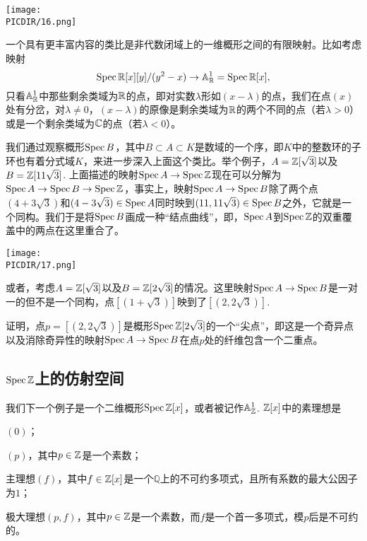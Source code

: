 \begin{center}\texttt{[image: \\PICDIR/16.png]}\end{center}

一个具有更丰富内容的类比是非代数闭域上的一维概形之间的有限映射。比如考虑映射
\[
	\operatorname{Spec} \mathbb{R}[x][y]/(y^2-x)\to \mathbb{A}_{\mathbb{R}}^1=\operatorname{Spec} \mathbb{R}[x],
\]
只看$\mathbb{A}_{\mathbb{R}}^1$中那些剩余类域为$\mathbb{R}$的点，即对实数$\lambda$形如$(x-\lambda)$的点，我们在点$(x)$处有分岔，对$\lambda\neq 0$，$(x-\lambda)$的原像是剩余类域为$\mathbb{R}$的两个不同的点（若$\lambda>0$）或是一个剩余类域为$\mathbb{C}$的点（若$\lambda<0$）。

我们通过观察概形$\operatorname{Spec} B$，其中$B\subset A\subset K$是数域的一个序，即$K$中的整数环的子环也有着分式域$K$，来进一步深入上面这个类比。举个例子，$A=\mathbb{Z}[\sqrt 3]$以及$B=\mathbb{Z}[11\sqrt 3]$. 上面描述的映射$\operatorname{Spec} A\to \operatorname{Spec} \mathbb{Z}$现在可以分解为$\operatorname{Spec} A\to \operatorname{Spec} B\to \operatorname{Spec} \mathbb{Z}$，事实上，映射$\operatorname{Spec} A\to \operatorname{Spec} B$除了两个点$(4+3\sqrt 3)$和$(4-3\sqrt 3)\in \operatorname{Spec} A$同时映到$(11,11\sqrt 3)\in\operatorname{Spec} B$之外，它就是一个同构。我们于是将$\operatorname{Spec} B$画成一种“结点曲线”，即，$\operatorname{Spec} A$到$\operatorname{Spec} \mathbb{Z}$的双重覆盖中的两点在这里重合了。

\begin{center}\texttt{[image: \\PICDIR/17.png]}\end{center}

或者，考虑$A=\mathbb{Z}[\sqrt 3]$以及$B=\mathbb{Z}[2\sqrt 3]$的情况。这里映射$\operatorname{Spec} A\to\operatorname{Spec} B$是一对一的但不是一个同构，点$[(1+\sqrt 3)]$映到了$[(2,2\sqrt{3})]$.

\begin{exe}
	证明，点$p=[(2,2\sqrt{3})]$是概形$\operatorname{Spec} \mathbb{Z}[2\sqrt 3]$的一个“尖点”，即这是一个奇异点以及消除奇异性的映射$\operatorname{Spec} A\to \operatorname{Spec} B$在点$p$处的纤维包含一个二重点。
\end{exe}

\subsection{\texorpdfstring{$\operatorname{Spec} \mathbb{Z}$}{Spec Z}上的仿射空间}

我们下一个例子是一个二维概形$\operatorname{Spec} \mathbb{Z}[x]$，或者被记作$\mathbb{A}_{\mathbb{Z}}^1$. $\mathbb{Z}[x]$中的素理想是
\begin{compactenum}[(i)]
	\item $(0)$；
	\item $(p)$，其中$p\in\mathbb{Z}$是一个素数；
	\item 主理想$(f)$，其中$f\in\mathbb{Z}[x]$是一个$\mathbb{Q}$上的不可约多项式，且所有系数的最大公因子为$1$；
	\item 极大理想$(p,f)$，其中$p\in \mathbb{Z}$是一个素数，而$f$是一个首一多项式，模$p$后是不可约的。
\end{compactenum}

